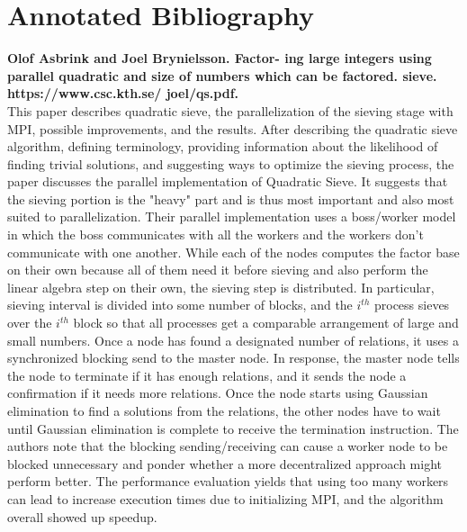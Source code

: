 \documentclass[11pt,twocolumn]{article}
\begin{document}



\newpage

\onecolumn
\section*{Annotated Bibliography}\label{annon}

\textbf{Olof Asbrink and Joel Brynielsson. Factor-
ing large integers using parallel quadratic
and size of numbers which can be factored.
sieve. https://www.csc.kth.se/ joel/qs.pdf.} \\

\indent This paper describes quadratic sieve, the parallelization of the sieving stage with MPI, possible improvements, and the results. After describing the quadratic sieve algorithm, defining terminology, providing information about the likelihood of finding trivial solutions, and suggesting ways to optimize the sieving process, the paper discusses the parallel implementation of Quadratic Sieve. It suggests that the sieving portion is the "heavy" part and is thus most important and also most suited to parallelization. Their parallel implementation uses a boss/worker model in which the boss communicates with all the workers and the workers don't communicate with one another. While each of the nodes computes the factor base on their own because all of them need it before sieving and also perform the linear algebra step on their own, the sieving step is distributed. In particular, sieving interval is divided into some number of blocks, and the $i^{th}$ process sieves over the $i^{th}$ block so that all processes get a comparable arrangement of large and small numbers. Once a node has found a designated number of relations, it uses a synchronized blocking send to the master node. In response, the master node tells the node to terminate if it has enough relations, and it sends the node a confirmation if it needs more relations. Once the node starts using Gaussian elimination to find a solutions from the relations, the other nodes have to wait until Gaussian elimination is complete to receive the termination instruction. The authors note that the blocking sending/receiving can cause a worker node to be blocked unnecessary and ponder whether a more decentralized approach might perform better. The performance evaluation yields that using too many workers can lead to increase execution times due to initializing MPI, and the algorithm overall showed up speedup.
\end{document}

